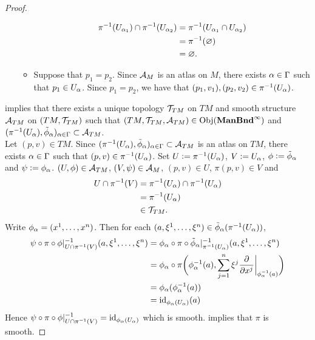 \documentclass{book}
\begin{document}
\begin{proof}
\begin{enumerate}[label=(\alph*)]
\begin{itemize}
			\begin{align*}
				\pi^{-1}(U_{\alpha_1}) \cap \pi^{-1}(U_{\alpha_2})
				& = \pi^{-1}(U_{\alpha_1} \cap U_{\alpha_2}) \\
				& = \pi^{-1}(\varnothing) \\
				& = \varnothing.
			\end{align*}
			\item Suppose that $p_1 = p_2$. Since $\mathcal{A}_M$ is an atlas on $M$, there exists $\alpha \in \Gamma$ such that $p_1 \in U_{\alpha}$. Since $p_1 = p_2$, we have that $(p_1, v_1), (p_2, v_2) \in \pi^{-1}(U_{\alpha})$.
		\end{itemize}
	\end{enumerate}
	 implies that there exists a unique topology $\mathcal{T}_{TM}$ on $TM$ and smooth structure $\mathcal{A}_{TM}$ on $(TM, \mathcal{T}_{TM})$ such that $(TM, \mathcal{T}_{TM}, \mathcal{A}_{TM}) \in \operatorname{Obj}(\operatorname*{\text{\textbf{ManBnd}}^{\infty}})$ and $(\pi^{-1}(U_{\alpha}), \tilde{\phi}_{\alpha})_{\alpha \in \Gamma} \subset \mathcal{A}_{TM}$. \vspace{.2cm} \\
	Let $(p,v) \in TM$. Since $(\pi^{-1}(U_{\alpha}), \tilde{\phi}_{\alpha})_{\alpha \in \Gamma} \subset \mathcal{A}_{TM}$ is an atlas on $TM$, there exists $\alpha \in \Gamma$ such that $(p,v) \in \pi^{-1}(U_{\alpha})$. Set $U \vcentcolon= \pi^{-1}(U_{\alpha})$, $V \vcentcolon= U_{\alpha}$, $\phi \vcentcolon= \tilde{\phi}_{\alpha}$ and $\psi \vcentcolon= \phi_{\alpha}$. $(U, \phi) \in \mathcal{A}_{TM}$, $(V, \psi) \in \mathcal{A}_M$, $(p,v) \in U$, $\pi(p,v) \in V$ and 
	\begin{align*}
		U \cap \pi^{-1}(V)
		& = \pi^{-1}(U_{\alpha}) \cap \pi^{-1}(U_{\alpha}) \\
		& = \pi^{-1}(U_{\alpha}) \\
		& \in \mathcal{T}_{TM}.
	\end{align*}
	Write $\phi_{\alpha} = (x^1, \ldots, x^n)$. Then for each $(a, \xi^1, \ldots, \xi^n) \in \tilde{\phi}_{\alpha}(\pi^{-1}(U_{\alpha}))$,
	\begin{align*}
		\psi \circ \pi \circ \phi|_{U \cap \pi^{-1}(V)}^{-1}(a, \xi^1, \ldots, \xi^n)
		& = \phi_{\alpha} \circ \pi \circ \tilde{\phi}_{\alpha}|_{\pi^{-1}(U_{\alpha})}^{-1}(a, \xi^1, \ldots, \xi^n) \\
		& = \phi_{\alpha} \circ \pi \bigg( \phi_{\alpha}^{-1}(a), \sum\limits_{j=1}^n \xi^j \frac{\partial}{\partial x^j} \bigg|_{\phi_{\alpha}^{-1}(a)} \bigg) \\
		& = \phi_{\alpha} (\phi_{\alpha}^{-1}(a)) \\
		& = \operatorname{id}_{\phi_{\alpha}(U_{\alpha})} (a) 
	\end{align*}
	Hence $\psi \circ \pi \circ \phi|_{U \cap \pi^{-1}(V)}^{-1} = \operatorname{id}_{\phi_{\alpha}(U_{\alpha})}$ which is smooth.  implies that $\pi$ is smooth.
\end{proof}
\end{document}
